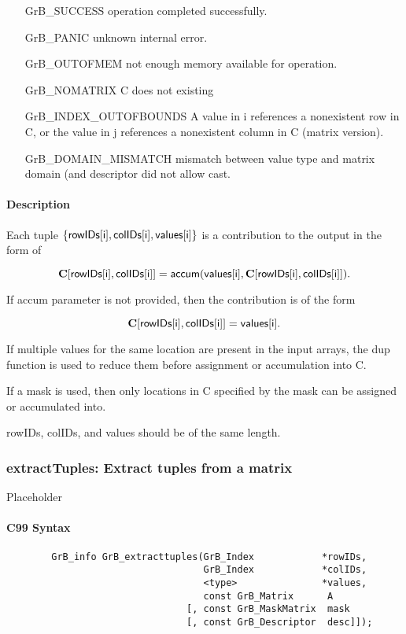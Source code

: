 \begin{itemize}[leftmargin=2.1in]
\item[{\sf GrB\_SUCCESS}] 	operation completed successfully.
\item[{\sf GrB\_PANIC}]	    unknown internal error.
\item[{\sf GrB\_OUTOFMEM}]	not enough memory available for operation.
\item[{\sf GrB\_NOMATRIX}]  C does not existing
\item[{\sf GrB\_INDEX\_OUTOFBOUNDS}]
        A value in i references a nonexistent row in C, or
	    the value in j references a nonexistent column in C (matrix version).
\item[\sf GrB\_DOMAIN\_MISMATCH]  
	   mismatch between value type and matrix domain (and descriptor did not allow cast.
\end{itemize}


\paragraph{Description}
Each tuple $\{ {\sf rowIDs[i]}, {\sf colIDs[i]}, {\sf values[i]}\}$ is a contribution to the output in the form of 

$${\bf C}[{\sf rowIDs[i]},{\sf colIDs[i]}] = {\sf accum}({\sf values[i]}, {\bf C}[{\sf rowIDs[i]}, {\sf colIDs[i]}]).$$

If {\sf accum} parameter is not provided, then the contribution is of the form 

$${\bf C}[{\sf rowIDs[i]}, {\sf colIDs[i]}] = {\sf values[i]}.$$

If multiple values for the same location are present in the input arrays, the 
dup function is used to reduce them before assignment or accumulation into {\sf C}.

If a mask is used, then only locations in {\sf C} specified by the mask can be assigned or
accumulated into.
 
{\sf rowIDs}, {\sf colIDs}, and {\sf values} should be of the same length. 


\subsubsection{{\sf extractTuples}: Extract tuples from a matrix}

Placeholder


\paragraph{C99 Syntax}

\begin{verbatim}
        GrB_info GrB_extracttuples(GrB_Index            *rowIDs,
                                   GrB_Index            *colIDs,
                                   <type>               *values, 
                                   const GrB_Matrix      A
                                [, const GrB_MaskMatrix  mask
                                [, const GrB_Descriptor  desc]]);
\end{verbatim}
